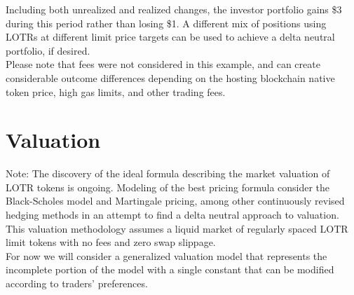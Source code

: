 \documentclass[12pt]{article}
\begin{document}
      Including both unrealized and realized changes, the investor portfolio gains \$3 during this period rather than losing \$1. A different mix of positions using LOTRs at different limit price targets can be used to achieve a delta neutral portfolio, if desired. \\
      
      Please note that fees were not considered in this example, and can create considerable outcome differences depending on the hosting blockchain native token price, high gas limits, and other trading fees.

   \section*{Valuation}
      Note: The discovery of the ideal formula describing the market valuation of LOTR tokens is ongoing. Modeling of the best pricing formula consider the Black-Scholes model and Martingale pricing, among other continuously revised hedging methods in an attempt to find a delta neutral approach to valuation. This valuation methodology assumes a liquid market of regularly spaced LOTR limit tokens with no fees and zero swap slippage. \\

      For now we will consider a generalized valuation model that represents the incomplete portion of the model with a single constant that can be modified according to traders' preferences.
\end{document}
